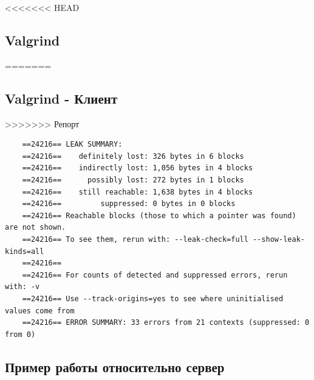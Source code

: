 \documentclass[a4paper,12pt]{report}
\begin{document}
<<<<<<< HEAD
\subsection{Valgrind}
=======
\subsection{Valgrind - Клиент}
>>>>>>> Репорт

\begin{verbatim}
    ==24216== LEAK SUMMARY:
    ==24216==    definitely lost: 326 bytes in 6 blocks
    ==24216==    indirectly lost: 1,056 bytes in 4 blocks
    ==24216==      possibly lost: 272 bytes in 1 blocks
    ==24216==    still reachable: 1,638 bytes in 4 blocks
    ==24216==         suppressed: 0 bytes in 0 blocks
    ==24216== Reachable blocks (those to which a pointer was found) are not shown.
    ==24216== To see them, rerun with: --leak-check=full --show-leak-kinds=all
    ==24216== 
    ==24216== For counts of detected and suppressed errors, rerun with: -v
    ==24216== Use --track-origins=yes to see where uninitialised values come from
    ==24216== ERROR SUMMARY: 33 errors from 21 contexts (suppressed: 0 from 0)
\end{verbatim}

\subsection{Пример работы относительно сервер}
\end{document}
